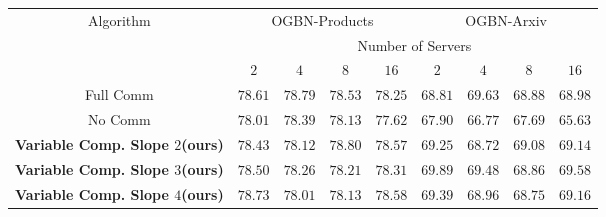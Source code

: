\begin{table*}
\centering
\begin{tabular}{c|cccccccc}
\hline
\multirow{3}{*}{Algorithm}    & \multicolumn{4}{c}{OGBN-Products}                                                                                        & \multicolumn{4}{|c}{OGBN-Arxiv}                                                                      \\ \cline{2-9} 
                              & \multicolumn{8}{c}{Number of Servers}                                                                                                                                                                                           \\ \cline{2-9} 
                              & \multicolumn{1}{c|}{$2$}     & \multicolumn{1}{c|}{$4$}     & \multicolumn{1}{c|}{$8$}     & \multicolumn{1}{c|}{$16$}    & \multicolumn{1}{c|}{$2$}     & \multicolumn{1}{c|}{$4$}     & \multicolumn{1}{c|}{$8$}     & $16$    \\ \hline
Full Comm& \multicolumn{1}{c|}{$78.61$} & \multicolumn{1}{c|}{$78.79$} & \multicolumn{1}{c|}{$78.53$} & \multicolumn{1}{c|}{$78.25$} & \multicolumn{1}{c|}{$68.81$} & \multicolumn{1}{c|}{$69.63$} & \multicolumn{1}{c|}{$68.88$} & \multicolumn{1}{c}{$68.98$} \\ \hline
No Comm& \multicolumn{1}{c|}{$78.01$} & \multicolumn{1}{c|}{$78.39$} & \multicolumn{1}{c|}{$78.13$} & \multicolumn{1}{c|}{$77.62$} & \multicolumn{1}{c|}{$67.90$} & \multicolumn{1}{c|}{$66.77$} & \multicolumn{1}{c|}{$67.69$} & \multicolumn{1}{c}{$65.63$} \\ \hline
\textbf{Variable Comp. Slope $2$(ours)}& \multicolumn{1}{c|}{$78.43$} & \multicolumn{1}{c|}{$78.12$} & \multicolumn{1}{c|}{$78.80$} & \multicolumn{1}{c|}{$78.57$} & \multicolumn{1}{c|}{$69.25$} & \multicolumn{1}{c|}{$68.72$} & \multicolumn{1}{c|}{$69.08$} & \multicolumn{1}{c}{$69.14$} \\ \hline
\textbf{Variable Comp. Slope $3$(ours)}& \multicolumn{1}{c|}{$78.50$} & \multicolumn{1}{c|}{$78.26$} & \multicolumn{1}{c|}{$78.21$} & \multicolumn{1}{c|}{$78.31$} & \multicolumn{1}{c|}{$69.89$} & \multicolumn{1}{c|}{$69.48$} & \multicolumn{1}{c|}{$68.86$} & \multicolumn{1}{c}{$69.58$} \\ \hline
\textbf{Variable Comp. Slope $4$(ours)}& \multicolumn{1}{c|}{$78.73$} & \multicolumn{1}{c|}{$78.01$} & \multicolumn{1}{c|}{$78.13$} & \multicolumn{1}{c|}{$78.58$} & \multicolumn{1}{c|}{$69.39$} & \multicolumn{1}{c|}{$68.96$} & \multicolumn{1}{c|}{$68.75$} & \multicolumn{1}{c}{$69.16$} \\ \hline

\end{tabular}
\end{table*}

